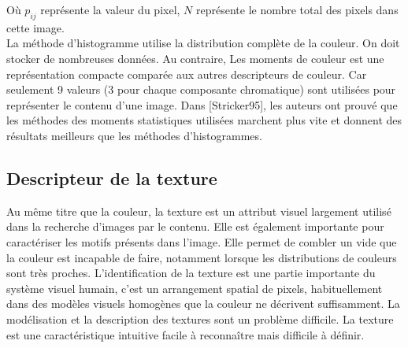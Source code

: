 Où $p_{ij}$ représente la valeur du pixel, $N$ représente le nombre total des pixels dans cette image.\\


La méthode d'histogramme utilise la distribution complète de la couleur. On doit stocker de nombreuses données. Au contraire, Les moments de couleur est une représentation compacte comparée aux autres descripteurs de couleur. Car seulement 9 valeurs (3 pour chaque composante chromatique) sont utilisées pour représenter le contenu d'une image. Dans [Stricker95], les auteurs ont prouvé que les méthodes des moments statistiques utilisées marchent plus vite et donnent des résultats meilleurs que les méthodes d’histogrammes.\\


%
%

\subsection{Descripteur de la texture}
Au même titre que la couleur, la texture est un  attribut visuel largement utilisé dans la recherche d’images par le contenu. Elle est également importante pour caractériser les motifs présents dans l’image. Elle permet de combler un vide que la couleur est incapable de faire, notamment lorsque les distributions de couleurs sont très proches. L'identification de la texture est une partie importante du système visuel humain, c'est un arrangement spatial de pixels, habituellement dans des modèles visuels homogènes que la couleur ne décrivent suffisamment. La modélisation et la description des textures sont un problème difficile. La texture est une caractéristique intuitive facile à reconnaître mais difficile à définir.

